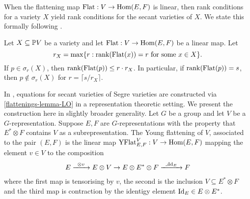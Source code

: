 When the flattening map $\mathrm{Flat} : V \to \operatorname{Hom}(E,F)$ is linear, then rank conditions for a variety $X$ yield rank conditions for the secant varieties of $X$. We state this formally following \cite[Prop. 4.1.1]{LO13}.
\begin{lemma}
 \label{flattenings-lemma-LO}
 Let $X \subseteq \mathbb{P} V$ be a variety and let $\mathrm{Flat} : V \to \operatorname{Hom}(E,F)$ be a linear map. Let 
 \[
 r_X = \max \{ r : \mathrm{rank} ( \mathrm{Flat}(x)) = r \text{ for some $x \in X$}\}.
 \]
If $p \in \sigma_r(X)$, then $\mathrm{rank}(\mathrm{Flat}(p)) \leq r \cdot r_X$. In particular, if $\mathrm{rank}(\mathrm{Flat}(p)) = s$, then $p \notin \sigma_r (X)$ for $r = \lceil s / r_X \rceil$.
\end{lemma}
In \cite{LO13}, equations for secant varieties of Segre varieties are constructed via \ref{flattenings-lemma-LO} in a representation theoretic setting. We present the construction here in slightly broader generality. Let $G$ be a group and let $V$ be a $G$-representation. Suppose $E,F$ are $G$-representations with the property that $E^* \otimes F$ contains $V$ as a subrepresentation. The Young flattening of $V$, associated to the pair $(E,F)$ is the linear map $\mathrm{YFlat}^V_{E,F} : V \to \operatorname{Hom}( E,F)$ mapping the element $v \in V$ to the composition
\begin{align*}
E \xto{\otimes v} E \otimes V \to E \otimes E^* \otimes F \xto{\lrcorner \Id_E} F
\end{align*}
where the first map is tensorising by $v$, the second is the inclusion $V \subseteq E^* \otimes F$ and the third map is contraction by the identigy element $\mathrm{Id}_E \in E \otimes E^*$.
